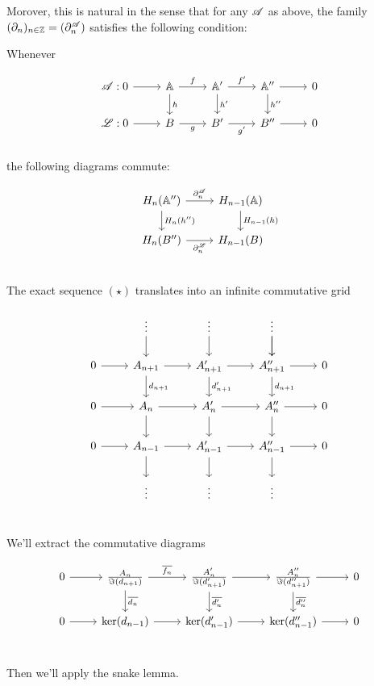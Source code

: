\documentclass[x11names,reqno,14pt]{extarticle}
\newcommand{\A}{\mathbb{A}}
\begin{document}
Morover, this is natural in the sense that for any $\mathscr{A}$ as above, the family $(\partial_n)_{n\in\mathbb{Z}} = (\partial_n^{\mathscr{A}})$ satisfies the following condition: 

Whenever 

\[
\begin{tikzcd}
\ms{A}:0\ar[r] & \A\ar[r, "f"]\ar[d, "h"] & \A' \ar[r, "f'"]\ar[d, "h'"] & \A'' \ar[r] \ar[d, "h''"]& 0 \\
\ms{L}: 0 \ar[r] & B \ar[r, "g"'] & B' \ar[r, "g'"'] & B'' \ar[r] & 0 \\
\end{tikzcd}
\]
the following diagrams commute:

\[
\begin{tikzcd}
H_n(\A'') \ar[r, "\del_n^\ms{A}"]\ar[d, "H_n(h'')"] & H_{n - 1}(\A) \ar[d, "H_{n - 1}(h)"] \\
H_n(B'') \ar[r, "\del_n^{\ms{L}}"'] & H_{n - 1}(B) \\
\end{tikzcd}
\]

\proof

The exact sequence $(\star)$ translates into an infinite commutative grid 

\[
\begin{tikzcd}
& \vdots \ar[d] & \vdots \ar[d] & \vdots \ar[d]\ar[d] & \\
0\ar[r]&A_{n + 1} \ar[r]\ar[d, "d_{n + 1}"] & A_{n + 1}' \ar[r] \ar[d, "d_{n + 1}'"]& A_{n + 1}'' \ar[r]\ar[d, " d_{n + 1}"]& 0 \\
0\ar[r]& A_n \ar[r] \ar[d]& A_n' \ar[r] \ar[d]& A_n'' \ar[r] \ar[d]& 0 \\
0\ar[r]& A_{n - 1} \ar[r]\ar[d]& A_{n - 1}' \ar[r]\ar[d]& A_{n - 1}'' \ar[r] \ar[d]& 0 \\
& \vdots & \vdots & \vdots & \\
\end{tikzcd}
\]

We'll extract the commutative diagrams 

\[
\begin{tikzcd}
0\ar[r]&\frac{A_n}{\Im(d_{n + 1})}\ar[d, "\bar{d_n}"] \ar[r, "\bar{f_n}"] & \frac{A_n'}{\Im(d_{n + 1}')} \ar[r]\ar[d, "\bar{d_n'}"] & \frac{A_n''}{\Im(d_{n + 1}'')} \ar[d, "\bar{d_n''}"]\ar[r]&0\\
0\ar[r]&\ker(d_{n - 1}) \ar[r]& \ker(d_{n - 1}') \ar[r] & \ker(d_{n - 1}'') \ar[r] & 0 \\
\end{tikzcd}
\]

Then we'll apply the snake lemma. 
\end{document}
